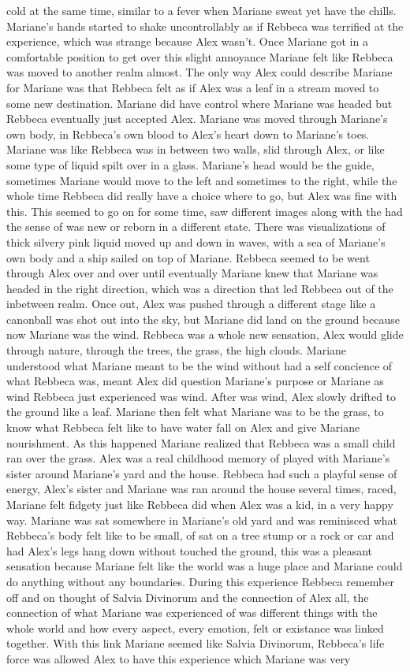 \documentclass[12pt]{book}
\begin{document}
cold at the same time, similar to a fever when Mariane sweat yet have the chills. Mariane's hands started to shake uncontrollably as if Rebbeca was terrified at the experience, which was strange because Alex wasn't. Once Mariane got in a comfortable position to get over this slight annoyance Mariane felt like Rebbeca was moved to another realm almost. The only way Alex could describe Mariane for Mariane was that Rebbeca felt as if Alex was a leaf in a stream moved to some new destination. Mariane did have control where Mariane was headed but Rebbeca eventually just accepted Alex. Mariane was moved through Mariane's own body, in Rebbeca's own blood to Alex's heart down to Mariane's toes. Mariane was like Rebbeca was in between two walls, slid through Alex, or like some type of liquid spilt over in a glass. Mariane's head would be the guide, sometimes Mariane would move to the left and sometimes to the right, while the whole time Rebbeca did really have a choice where to go, but Alex was fine with this. This seemed to go on for some time, saw different images along with the had the sense of was new or reborn in a different state. There was visualizations of thick silvery pink liquid moved up and down in waves, with a sea of Mariane's own body and a ship sailed on top of Mariane. Rebbeca seemed to be went through Alex over and over until eventually Mariane knew that Mariane was headed in the right direction, which was a direction that led Rebbeca out of the inbetween realm. Once out, Alex was pushed through a different stage like a canonball was shot out into the sky, but Mariane did land on the ground because now Mariane was the wind. Rebbeca was a whole new sensation, Alex would glide through nature, through the trees, the grass, the high clouds. Mariane understood what Mariane meant to be the wind without had a self concience of what Rebbeca was, meant Alex did question Mariane's purpose or Mariane as wind Rebbeca just experienced was wind. After was wind, Alex slowly drifted to the ground like a leaf. Mariane then felt what Mariane was to be the grass, to know what Rebbeca felt like to have water fall on Alex and give Mariane nourishment. As this happened Mariane realized that Rebbeca was a small child ran over the grass. Alex was a real childhood memory of played with Mariane's sister around Mariane's yard and the house. Rebbeca had such a playful sense of energy, Alex's sister and Mariane was ran around the house several times, raced, Mariane felt fidgety just like Rebbeca did when Alex was a kid, in a very happy way. Mariane was sat somewhere in Mariane's old yard and was reminisced what Rebbeca's body felt like to be small, of sat on a tree stump or a rock or car and had Alex's legs hang down without touched the ground, this was a pleasant sensation because Mariane felt like the world was a huge place and Mariane could do anything without any boundaries. During this experience Rebbeca remember off and on thought of Salvia Divinorum and the connection of Alex all, the connection of what Mariane was experienced of was different things with the whole world and how every aspect, every emotion, felt or existance was linked together. With this link Mariane seemed like Salvia Divinorum, Rebbeca's life force was allowed Alex to have this experience which Mariane was very 
\end{document}
